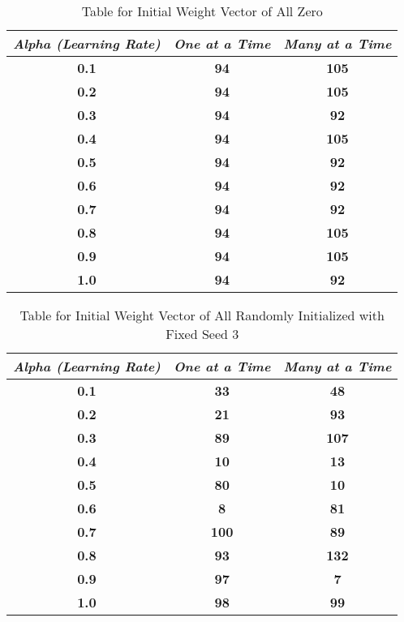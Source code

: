 \documentclass[conference]{IEEEtran}
\begin{document}
\begin{itemize}
\begin{table}[htbp]
\caption{Table for Initial Weight Vector of All Zero}
\begin{center}
\begin{tabular}{|c|c|c|}
\hline
\textbf{\textit{Alpha (Learning Rate)}}& \textbf{\textit{One at a Time}}& \textbf{\textit{Many at a Time}} \\
\hline
\textbf{{0.1}}& \textbf{{94}}& \textbf{{105}} \\
\hline
\textbf{{0.2}}& \textbf{{94}}& \textbf{{105}} \\
\hline
\textbf{{0.3}}& \textbf{{94}}& \textbf{{92}} \\
\hline
\textbf{{0.4}}& \textbf{{94}}& \textbf{{105}} \\
\hline
\textbf{{0.5}}& \textbf{{94}}& \textbf{{92}} \\
\hline
\textbf{{0.6}}& \textbf{{94}}& \textbf{{92}} \\
\hline
\textbf{{0.7}}& \textbf{{94}}& \textbf{{92}} \\
\hline
\textbf{{0.8}}& \textbf{{94}}& \textbf{{105}} \\
\hline
\textbf{{0.9}}& \textbf{{94}}& \textbf{{105}} \\
\hline
\textbf{{1.0}}& \textbf{{94}}& \textbf{{92}} \\
\hline
\end{tabular}
\label{tab1}
\end{center}
\end{table}


\begin{table}[htbp]
\caption{Table for Initial Weight Vector of All Randomly Initialized with Fixed Seed 3}
\begin{center}
\begin{tabular}{|c|c|c|}
\hline
\textbf{\textit{Alpha (Learning Rate)}}& \textbf{\textit{One at a Time}}& \textbf{\textit{Many at a Time}} \\
\hline
\textbf{{0.1}}& \textbf{{33}}& \textbf{{48}} \\
\hline
\textbf{{0.2}}& \textbf{{21}}& \textbf{{93}} \\
\hline
\textbf{{0.3}}& \textbf{{89}}& \textbf{{107}} \\
\hline
\textbf{{0.4}}& \textbf{{10}}& \textbf{{13}} \\
\hline
\textbf{{0.5}}& \textbf{{80}}& \textbf{{10}} \\
\hline
\textbf{{0.6}}& \textbf{{8}}& \textbf{{81}} \\
\hline
\textbf{{0.7}}& \textbf{{100}}& \textbf{{89}} \\
\hline
\textbf{{0.8}}& \textbf{{93}}& \textbf{{132}} \\
\hline
\textbf{{0.9}}& \textbf{{97}}& \textbf{{7}} \\
\hline
\textbf{{1.0}}& \textbf{{98}}& \textbf{{99}} \\
\hline
\end{tabular}
\label{tab1}
\end{center}
\end{table}




\end{itemize}
\end{document}
